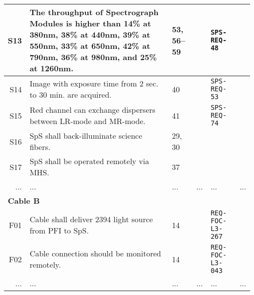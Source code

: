\begin{landscape}
\begin{longtable}{r|p{80mm}|p{25mm}|c|p{30mm}|p{45mm}}
S13	 & The throughput of Spectrograph Modules is higher than 14\% at 380nm, 38\% at 440nm, 39\% at 550nm, 33\% at 650nm, 42\% at 790nm, 36\% at 980nm, and 25\% at 1260nm.	& 53, 56--59  	& 	& {\tt SPS-REQ-48}	& 	\\ \hline
S14	 & Image with exposure time from 2 sec. to 30 min. are acquired.	& 40 	& 	& {\tt SPS-REQ-53}	& 	\\ \hline
S15 & Red channel can exchange dispersers between LR-mode and MR-mode.	& 41 	& 	& {\tt SPS-REQ-74}	& 	\\ \hline
S16	 & SpS shall back-illuminate science fibers.	& 29, 30 	& 	& 	& 	\\ \hline
S17	& SpS shall be operated remotely via MHS.	& 37	& 	& 	& 	\\ \hline
...	& ...	& ...	& ...	& ...	& ...	\\ \hline
\hline
\multicolumn{6}{l}{\hspace{5mm} {\bf Cable B}} \\ \hline
F01		& Cable shall deliver 2394 light source from PFI to SpS.	& 14	& 	& {\tt REQ-FOC-L3-267}	& 	\\ \hline
F02		& Cable connection should be monitored remotely. 	& 14	& 	& {\tt REQ-FOC-L3-043}	& 	\\ \hline
...	& ...	& ...	& ...	& ...	& ...	\\ \hline
\end{longtable}
\end{landscape}